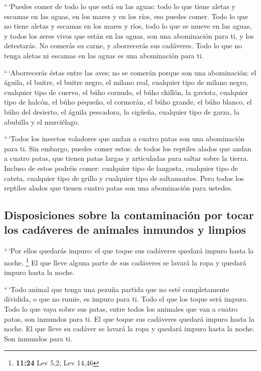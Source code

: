 \begin{paracol}{2}
 ``\,`Puedes comer de todo lo que está en las aguas: todo
lo que tiene aletas y escamas en las aguas, en los mares y en los ríos,
eso puedes comer.  Todo lo que no tiene aletas y escamas
en los mares y ríos, todo lo que se mueve en las aguas, y todos los
seres vivos que están en las aguas, son una abominación para ti,
 y los detestarás. No comerás su carne, y aborrecerás sus
cadáveres.  Todo lo que no tenga aletas ni escamas en las
aguas es una abominación para ti.

 ``\,`Aborrecerás éstas entre las aves; no se comerán
porque son una abominación: el águila, el buitre, el buitre negro,
 el milano real, cualquier tipo de milano negro,
 cualquier tipo de cuervo,  el búho
cornudo, el búho chillón, la gaviota, cualquier tipo de halcón,
 el búho pequeño, el cormorán, el búho grande,
 el búho blanco, el búho del desierto, el águila
pescadora,  la cigüeña, cualquier tipo de garza, la
abubilla y el murciélago.

 ``\,`Todos los insectos voladores que andan a cuatro
patas son una abominación para ti.  Sin embargo, puedes
comer estos: de todos los reptiles alados que andan a cuatro patas, que
tienen patas largas y articuladas para saltar sobre la tierra.
 Incluso de estos podréis comer: cualquier tipo de
langosta, cualquier tipo de cateta, cualquier tipo de grillo y cualquier
tipo de saltamontes.  Pero todos los reptiles alados que
tienen cuatro patas son una abominación para ustedes.

\hypertarget{disposiciones-sobre-la-contaminaciuxf3n-por-tocar-los-caduxe1veres-de-animales-inmundos-y-limpios}{%
\subsection{Disposiciones sobre la contaminación por tocar los cadáveres
de animales inmundos y
limpios}\label{disposiciones-sobre-la-contaminaciuxf3n-por-tocar-los-caduxe1veres-de-animales-inmundos-y-limpios}}

 ``\,`Por ellos quedarás impuro: el que toque sus
cadáveres quedará impuro hasta la noche. \footnote{\textbf{11:24} Lev
  5,2; Lev 14,46}  El que lleve alguna parte de sus
cadáveres se lavará la ropa y quedará impuro hasta la noche.

 ``\,`Todo animal que tenga una pezuña partida que no
esté completamente dividida, o que no rumie, es impuro para ti. Todo el
que los toque será impuro.  Todo lo que vaya sobre sus
patas, entre todos los animales que van a cuatro patas, son inmundos
para ti. El que toque sus cadáveres quedará impuro hasta la noche.
 El que lleve su cadáver se lavará la ropa y quedará
impuro hasta la noche. Son inmundos para ti.


\end{paracol}
